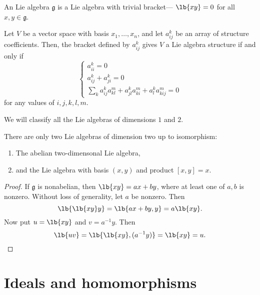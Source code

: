 \documentclass{article}
\DeclarePairedDelimiter\lb\lbrack\rbrack
\newcommand*\frkg{{\ensuremath{\mathfrak{g}}}}
\begin{document}
\begin{definition}
    An  Lie algebra $\frkg$ is a Lie algebra with trivial bracket--- $\lb{xy} = 0$ for all $x,y \in \frkg$.
\end{definition}

\begin{proposition}
    Let $V$ be a vector space with basis $x_1,\ldots,x_n$, and let $a_{ij}^k$ be an array of structure coefficients.
    Then, the bracket defined by $a_{ij}^k$ gives $V$ a Lie algebra structure if and only if
    \[
        \begin{cases}
            a_{ii}^k = 0 \\
            a_{ij}^k + a_{ji}^k = 0 \\
            \sum_k
            a_{ij}^ka_{kl}^m
            + a_{jl}^ka_{ki}^m
            + a_{l}^ka_{kij}^m
            =
            0
        \end{cases}
    \]
    for any values of $i,j,k,l,m$.
\end{proposition}

We will classify all the Lie algebras of dimensions $1$ and $2$.

\begin{proposition}
    There are only two Lie algebras of dimension two up to isomorphism:
    \begin{enumerate}[label=(\alph*)]
        \item 
            The abelian two-dimensonal Lie algebra,
        \item 
            and the Lie algebra with basis $(x,y)$ and product $[x,y] = x$.
    \end{enumerate}
\end{proposition}

\begin{proof}
    If $\frkg$ is nonabelian, then $\lb{xy} = ax + by$, where at least one of $a, b$ is nonzero.
    Without loss of generality, let $a$ be nonzero.
    Then
    \[
        \lb{\lb{xy}y}
        =
        \lb{ax + by,y}
        =
        a\lb{xy}.
    \]
    Now put $u = \lb{xy}$ and $v = a^{-1}y$.
    Then
    \[
        \lb{uv}
        =
        \lb{\lb{xy},(a^{-1}y)}
        =
        \lb{xy}
        =
        u.
    \]
\end{proof}

\section{
Ideals and homomorphisms 
\texorpdfstring{\cite[\S 2]{Hum72}}{[Hum.\S 2]}
}
\end{document}
